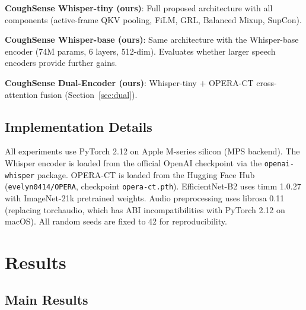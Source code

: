 \documentclass[10pt,journal,compsoc]{IEEEtran}
\begin{document}
\textbf{CoughSense Whisper-tiny (ours)}: Full proposed architecture
with all components (active-frame QKV pooling, FiLM, GRL, Balanced
Mixup, SupCon).

\textbf{CoughSense Whisper-base (ours)}: Same architecture with the
Whisper-base encoder (74M params, 6 layers, 512-dim).
Evaluates whether larger speech encoders provide further gains.

\textbf{CoughSense Dual-Encoder (ours)}: Whisper-tiny $+$ OPERA-CT
cross-attention fusion (Section~\ref{sec:dual}).

\subsection{Implementation Details}
\label{sec:impl}

All experiments use PyTorch 2.12 on Apple M-series silicon (MPS backend).
The Whisper encoder is loaded from the official OpenAI checkpoint via the
\texttt{openai-whisper} package. OPERA-CT is loaded from the Hugging Face
Hub (\texttt{evelyn0414/OPERA}, checkpoint \texttt{opera-ct.pth}).
EfficientNet-B2 uses timm 1.0.27 with ImageNet-21k pretrained weights.
Audio preprocessing uses librosa 0.11 (replacing torchaudio, which has
ABI incompatibilities with PyTorch 2.12 on macOS).
All random seeds are fixed to 42 for reproducibility.

\section{Results}
\label{sec:results}

\subsection{Main Results}
\end{document}
